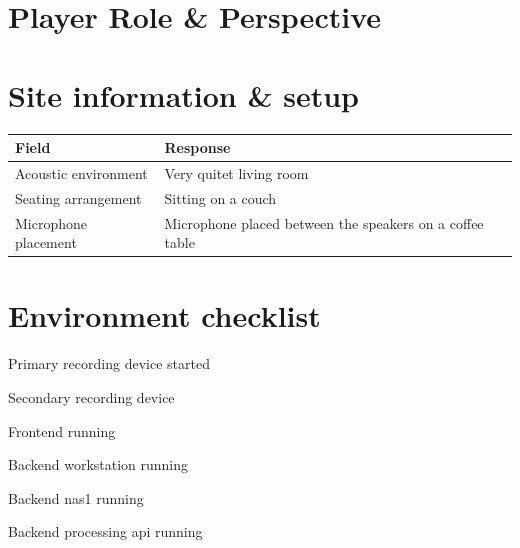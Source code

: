 
\section{Player Role \& Perspective}

\section{Site information \& setup}
\begin{table}[h]
\centering
\begin{tabular}{|p{5cm}|p{10cm}|}
\hline
\textbf{Field} & \textbf{Response} \\ \hline
Acoustic environment & Very quitet living room \\[1.5cm] \hline
Seating arrangement & Sitting on a couch\\[1.5cm] \hline
Microphone placement & Microphone placed between the speakers on a coffee table\\[1.5cm] \hline
\end{tabular}
\end{table}

\section{Environment checklist}
    \begin{todolist}
    \item[\done] Primary recording device started
    \item[\done] Secondary recording device
    \item[\done] Frontend running
    \item[\done] Backend workstation running
    \item[\done] Backend nas1 running
    \item[\done] Backend processing api running
    \end{todolist}

